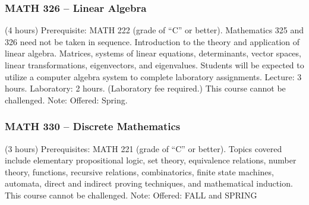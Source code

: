 \subsubsection{MATH 326 -- Linear Algebra}%
\label{course:MATH:326}
(4 hours) Prerequisite: MATH 222 (grade of “C” or better). Mathematics 325 and 326 need not be taken in sequence. Introduction to the theory and application of linear algebra. Matrices, systems of linear equations, determinants, vector spaces, linear transformations, eigenvectors, and eigenvalues. Students will be expected to utilize a computer algebra system to complete laboratory assignments. Lecture: 3 hours. Laboratory: 2 hours. (Laboratory fee required.) This course cannot be challenged. Note: Offered: Spring.

\subsubsection{MATH 330 -- Discrete Mathematics}%
\label{course:MATH:330}
(3 hours) Prerequisites: MATH 221 (grade of “C” or better). Topics covered include elementary propositional logic, set theory, equivalence relations, number theory, functions, recursive relations, combinatorics, finite state machines, automata, direct and indirect proving techniques, and mathematical induction. This course cannot be challenged. Note: Offered: FALL and SPRING